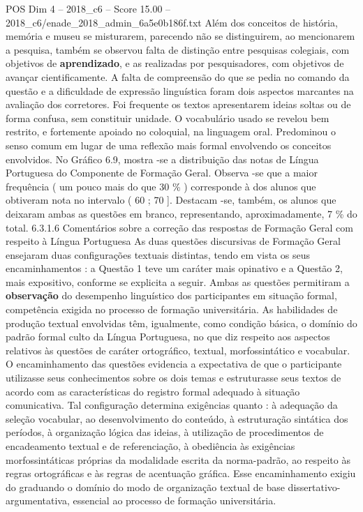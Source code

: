 \begin{textsample}{POS Dim 4 – 2018\_c6 – Score 15.00 – 2018\_c6/enade\_2018\_admin\_6a5e0b186f.txt}
Além dos conceitos de história, memória e museu se misturarem, parecendo não se distinguirem, ao mencionarem a pesquisa, também se observou falta de distinção entre pesquisas colegiais, com objetivos de \textbf{aprendizado}, e as realizadas por pesquisadores, com objetivos de avançar cientificamente.
A falta de compreensão do que se pedia no comando da questão e a dificuldade de expressão linguística foram dois aspectos marcantes na avaliação dos corretores.
Foi frequente os textos apresentarem ideias soltas ou de forma confusa, sem constituir unidade.
O vocabulário usado se revelou bem restrito, e fortemente apoiado no coloquial, na linguagem oral.
Predominou o senso comum em lugar de uma reflexão mais formal envolvendo os conceitos envolvidos.
No Gráfico 6.9, mostra -se a distribuição das notas de Língua Portuguesa do Componente de Formação Geral.
Observa -se que a maior frequência ( um pouco mais do que 30 \% ) corresponde à dos alunos que obtiveram nota no intervalo ( 60 ; 70 ].
Destacam -se, também, os alunos que deixaram ambas as questões em branco, representando, aproximadamente, 7 \% do total. 6.3.1.6 Comentários sobre a correção das respostas de Formação Geral com respeito à Língua Portuguesa As duas questões discursivas de Formação Geral ensejaram duas configurações textuais distintas, tendo em vista os seus encaminhamentos : a Questão 1 teve um caráter mais opinativo e a Questão 2, mais expositivo, conforme se explicita a seguir.
Ambas as questões permitiram a \textbf{observação} do desempenho linguístico dos participantes em situação formal, competência exigida no processo de formação universitária.
As habilidades de produção textual envolvidas têm, igualmente, como condição básica, o domínio do padrão formal culto da Língua Portuguesa, no que diz respeito aos aspectos relativos às questões de caráter ortográfico, textual, morfossintático e vocabular.
O encaminhamento das questões evidencia a expectativa de que o participante utilizasse seus conhecimentos sobre os dois temas e estruturasse seus textos de acordo com as características do registro formal adequado à situação comunicativa.
Tal configuração determina exigências quanto : à adequação da seleção vocabular, ao desenvolvimento do conteúdo, à estruturação sintática dos períodos, à organização lógica das ideias, à utilização de procedimentos de encadeamento textual e de referenciação, à obediência às exigências morfossintáticas próprias da modalidade escrita da norma-padrão, ao respeito às regras ortográficas e às regras de acentuação gráfica.
Esse encaminhamento exigiu do graduando o domínio do modo de organização textual de base dissertativo-argumentativa, essencial ao processo de formação universitária.

\end{textsample}
